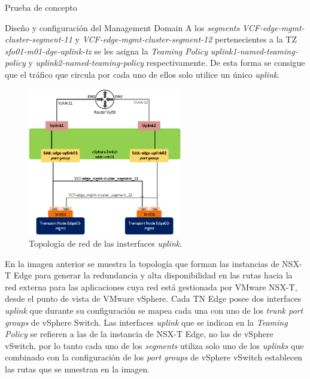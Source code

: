\begin{section}{Prueba de concepto}
\begin{subsection}{Diseño y configuración del Management Domain}
    A los \textit{segments} \textit{VCF-edge-mgmt-cluster-segment-11} y \textit{VCF-edge-mgmt-cluster-segment-12} pertenecientes a la TZ \textit{sfo01-m01-dge-uplink-tz} se les asigna la \textit{Teaming Policy} \textit{uplink1-named-teaming-policy} y \textit{uplink2-named-teaming-policy} respectivamente. De esta forma se consigue que el tráfico que circula por cada uno de ellos solo utilice un único \textit{uplink}. 
    \begin{figure}[h]
      \centering
      \includegraphics[width=0.6\textwidth]{imaxes/pruebaconcepto/UplinkDesign.png}
      \caption{Topología de red de las insterfaces \textit{uplink}.}
      \label{fig:Uplink-Design-Edge-NSXT} 
    \end{figure}
    \FloatBarrier
    En la imagen anterior se muestra la topología que forman las instancias de NSX-T Edge para generar la redundancia y alta disponibilidad en las rutas hacia la red externa para las aplicaciones cuya red está gestionada por VMware NSX-T, desde el punto de vista de VMware vSphere. Cada TN Edge posee dos interfaces \textit{uplink} que durante su configuración se mapea cada una con uno de los \textit{trunk port groups} de vSphere Switch. Las interfaces \textit{uplink} que se indican en la \textit{Teaming Policy} se refieren a las de la instancia de NSX-T Edge, no las de vSphere vSwitch, por lo tanto cada uno de los \textit{segments} utiliza solo uno de los \textit{uplinks} que combinado con la configuración de los \textit{port groups} de vSphere vSwitch establecen las rutas que se muestran en la imagen.

\end{subsection}
\end{section}
